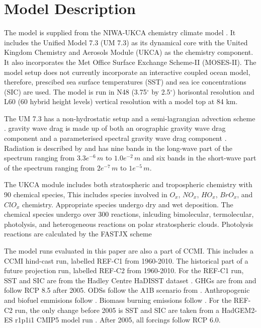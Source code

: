 \section{Model Description}

The model is supplied from the NIWA-UKCA chemistry climate model \citep{Morgenstern:2009bu}. It includes the Unified Model 7.3 (UM 7.3) as its dynamical core with the United Kingdom Chemistry and Aerosols Module (UKCA) as the chemistry component. It also incorporates the Met Office Surface Exchange Scheme-II (MOSES-II). The model setup does not currently incorporate an interactive coupled ocean model, therefore, prescibed sea surface temperatures (SST) and sea ice concentrations (SIC) are used. The model is run in N48 (3.75$^\circ$ by 2.5$^\circ$) horisontal resolution and L60 (60 hybrid height levels) vertical resolution with a model top at 84 km.

The UM 7.3 has a non-hydrostatic setup \citep{Davies:2005vu} and a semi-lagrangian advection scheme \citep{Priestley:1993ur}. gravity wave drag is made up of both an orographic gravity wave drag component \citep{Webster:2003vf} and a parameterised spectral gravity wave drag component \citep{Scaife:2002vt}. Radiation is described by \citep{Edwards:1996wo} and has nine bands in the long-wave part of the spectrum ranging from $3.3e^{-6}\,m$ to $1.0e^{-2}\,m$ and six bands in the short-wave part of the spectrum ranging from $2e^{-7}\,m$ to $1e^{-5}\,m$.

The UKCA module includes both stratospheric and tropospheric chemistry with 90 chemical species, This includes species involved in $O_x$, $NO_x$, $HO_x$, $BrO_x$, and $ClO_x$ chemistry. Appropriate species undergo dry and wet deposition. The chemical species undergo over 300 reactions, inlcuding bimolecular, termolecular, photolysis, and heterogeneous reactions on polar stratospheric clouds. Photolysis reactions are calculated by the FASTJX scheme \cite{Neu:2007wi}

The model runs evaluated in this paper are also a part of CCMI. This includes a CCMI hind-cast run, labelled REF-C1 from 1960-2010. The historical part of a future projection run, labelled REF-C2 from 1960-2010. For the REF-C1 run, SST and SIC are from the Hadley Centre HaDISST dataset \citep{Rayner:2003ty}. GHGs are from \citep{Meinshausen:2011is} \citep{Riahi:2011dk} and follow RCP 8.5 after 2005. ODSs follow the A1B scenario from \citep{WMO:2011vf}. Anthropogenic and biofuel emmisions follow \citep{Granier:2011dw}. Biomass burning emissions follow \citep{Lamarque:2011wr} \citep{vanderWerf:2006gi} \citep{Schultz:2008wf}. For the REF-C2 run, the only change before 2005 is SST and SIC are taken from a HadGEM2-ES r1p1i1 CMIP5 model run \citep{Jones:2011ii}. After 2005, all forcings follow RCP 6.0. 